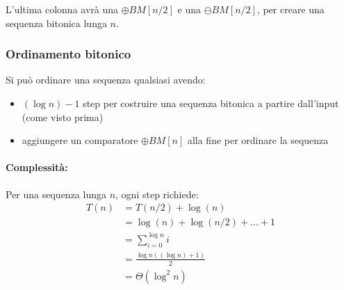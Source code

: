L'ultima colonna avrà una $\oplus BM [n/2]$ e una $\ominus BM [n/2]$, per creare una sequenza bitonica lunga $n$.

\subsubsection{Ordinamento bitonico}

Si può ordinare una sequenza qualsiasi avendo: 
\begin{itemize}
    \item $(\log n) - 1$ step per costruire una sequenza bitonica a partire dall'input (come visto prima)
    
    \item aggiungere un comparatore $\oplus BM [n]$ alla fine per ordinare la sequenza
\end{itemize}

\paragraph{Complessità:} Per una sequenza lunga $n$, ogni step richiede: 
\begin{align*}
    T(n) & = T(n/2) + \log (n) \\
    & = \log (n) + \log (n/2) + \dots + 1 \\
    & = \sum_{i=0}^{\log n} i \\
    & = \frac{\log n \left((\log n) + 1\right)}{2} \\
    & = \Theta (\log^2 n) 
\end{align*}


